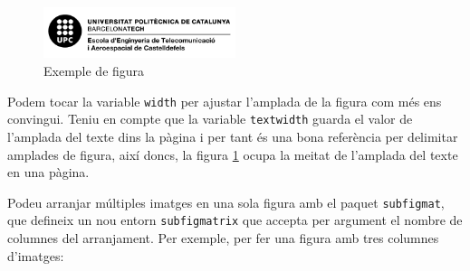 \begin{figure}[htb]
\begin{center}
\includegraphics[width=0.5\textwidth]{./setup/EETAC-positiu-negre}
\caption{Exemple de figura}
\label{F:prova}
\end{center}
\end{figure}

Podem tocar la variable \texttt{width} per ajustar l'amplada de la figura com més ens convingui. Teniu en compte que la variable \texttt{textwidth} guarda el valor de l'amplada del texte dins la pàgina i per tant és una bona referència per delimitar amplades de figura, així doncs, la figura \ref{F:prova} ocupa la meitat de l'amplada del texte en una pàgina. 

Podeu arranjar múltiples imatges en una sola figura amb el paquet \texttt{subfigmat}, que defineix un nou entorn \texttt{subfigmatrix} que accepta per argument el nombre de columnes del arranjament. Per exemple, per fer una figura amb tres columnes d'imatges:

